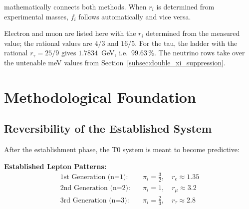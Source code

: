 	mathematically connects both methods. When $r_i$ is determined from experimental masses, $f_i$ follows automatically and vice versa.
	
	\begin{table}[H]
		\centering
		\caption{Numerical equivalence of both T0 methods for all leptons}
		\label{tab:numerical_equivalence_complete}
	\end{table}
	
	Electron and muon are listed here with the $r_i$ determined from the measured value; the rational values are $4/3$ and $16/5$. For the tau, the ladder with the rational $r_\tau = 25/9$ gives $1.7834$~GeV, i.e.\ $99.63\,\%$. The neutrino rows take over the untenable meV values from Section~\ref{subsec:double_xi_suppression}.
	
	\section{Methodological Foundation}
	\label{sec:scientific_legitimacy}
	
	\subsection{Reversibility of the Established System}
	\label{subsec:reversibility}
	
	After the establishment phase, the T0 system is meant to become predictive:
	
	\textbf{Established Lepton Patterns:}
	\begin{align}
		\text{1st Generation (n=1):} \quad &\pi_i = \frac{3}{2}, \quad r_e \approx 1.35 \\
		\text{2nd Generation (n=2):} \quad &\pi_i = 1, \quad r_\mu \approx 3.2 \\
		\text{3rd Generation (n=3):} \quad &\pi_i = \frac{2}{3}, \quad r_\tau \approx 2.8
	\end{align}
	
